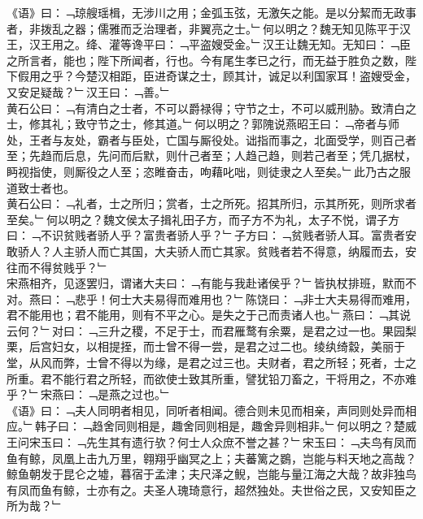 《语》曰：﹁琼艘瑶楫，无涉川之用；金弧玉弦，无激矢之能。是以分絜而无政事者，非拨乱之器；儒雅而乏治理者，非翼亮之士。﹂何以明之？魏无知见陈平于汉王，汉王用之。绛、灌等谗平曰：﹁平盗嫂受金。﹂汉王让魏无知。无知曰：﹁臣之所言者，能也；陛下所闻者，行也。今有尾生孝已之行，而无益于胜负之数，陛下假用之乎？今楚汉相距，臣进奇谋之士，顾其计，诚足以利国家耳！盗嫂受金，又安足疑哉？﹂汉王曰：﹁善。﹂\\
黄石公曰：﹁有清白之士者，不可以爵禄得；守节之士，不可以威刑胁。致清白之士，修其礼；致守节之士，修其道。﹂何以明之？郭隗说燕昭王曰：﹁帝者与师处，王者与友处，霸者与臣处，亡国与厮役处。诎指而事之，北面受学，则百己者至；先趋而后息，先问而后默，则什己者至；人趋己趋，则若己者至；凭几据杖，眄视指使，则厮役之人至；恣睢奋击，呴藉叱咄，则徒隶之人至矣。﹂此乃古之服道致士者也。\\
黄石公曰：﹁礼者，士之所归；赏者，士之所死。招其所归，示其所死，则所求者至矣。﹂何以明之？魏文侯太子揖礼田子方，而子方不为礼，太子不悦，谓子方曰：﹁不识贫贱者骄人乎？富贵者骄人乎？﹂子方曰：﹁贫贱者骄人耳。富贵者安敢骄人？人主骄人而亡其国，大夫骄人而亡其家。贫贱者若不得意，纳履而去，安往而不得贫贱乎？﹂\\
宋燕相齐，见逐罢归，谓诸大夫曰：﹁有能与我赴诸侯乎？﹂皆执杖排班，默而不对。燕曰：﹁悲乎！何士大夫易得而难用也？﹂陈饶曰：﹁非士大夫易得而难用，君不能用也；君不能用，则有不平之心。是失之于己而责诸人也。﹂燕曰：﹁其说云何？﹂对曰：﹁三升之稷，不足于士，而君雁鹜有余粟，是君之过一也。果园梨栗，后宫妇女，以相提挃，而士曾不得一尝，是君之过二也。绫纨绮縠，美丽于堂，从风而弊，士曾不得以为缘，是君之过三也。夫财者，君之所轻；死者，士之所重。君不能行君之所轻，而欲使士致其所重，譬犹铅刀畜之，干将用之，不亦难乎？﹂宋燕曰：﹁是燕之过也。﹂\\
《语》曰：﹁夫人同明者相见，同听者相闻。德合则未见而相亲，声同则处异而相应。﹂韩子曰：﹁趋舍同则相是，趣舍同则相是，趣舍异则相非。﹂何以明之？楚威王问宋玉曰：﹁先生其有遗行欤？何士人众庶不誉之甚？﹂宋玉曰：﹁夫鸟有凤而鱼有鲸，凤凰上击九万里，翱翔乎幽冥之上；夫蕃篱之鷃，岂能与料天地之高哉？鲸鱼朝发于昆仑之墟，暮宿于孟津；夫尺泽之鲵，岂能与量江海之大哉？故非独鸟有凤而鱼有鲸，士亦有之。夫圣人瑰琦意行，超然独处。夫世俗之民，又安知臣之所为哉？﹂
\\
